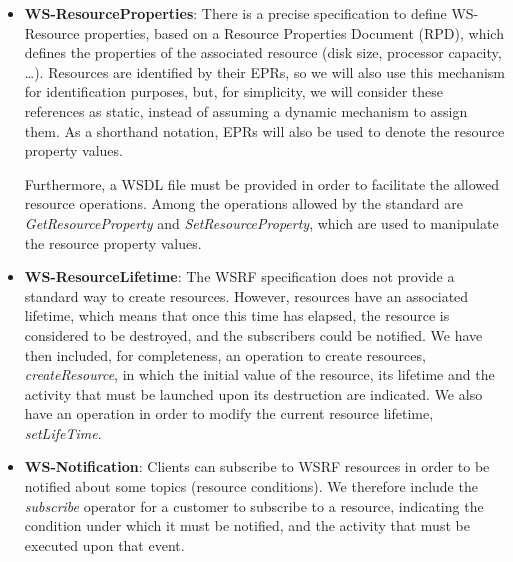\begin{itemize}
\item {\bf WS-ResourceProperties}: There is a precise specification 
to define WS-Resource properties, based on 
a Resource Properties Document (RPD),  which
defines the properties of the associated resource
(disk size, processor capacity, \ldots). 
Resources are identified by their EPRs,
so we will also use this mechanism for identification purposes,
but, for simplicity, we will consider these references as static, instead
of assuming a dynamic mechanism to assign them.
As a shorthand notation, EPRs will also be used to denote
the resource property values.

Furthermore,
a WSDL file must be provided in order to
facilitate the allowed resource operations.
Among the operations allowed by the standard are \emph{GetResourceProperty} 
and \emph{SetResourceProperty}, which are used to manipulate 
the resource property values.
%
%
%
\item {\bf WS-ResourceLifetime}: The WSRF specification does not 
provide a standard way to create resources. However,
resources have an associated lifetime, which means that once
this time has elapsed, the resource is considered to be destroyed,
and the subscribers could be notified.
%
We have then included, for completeness, an operation to create
resources, {\em createResource}, in which the initial value
of the resource, its lifetime and the activity that must
be launched upon its destruction are indicated. We also have
an operation in order to modify the current resource lifetime,
{\em setLifeTime}. 

\item {\bf WS-Notification}: Clients can subscribe to WSRF
resources in order to be notified about some topics (resource
conditions). We therefore include the {\em subscribe} operator 
for a customer to subscribe to a resource, indicating the
condition under which it must be notified, and the activity that
must be executed 
upon that event.



\end{itemize}
